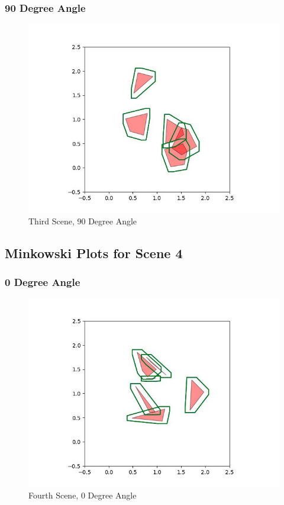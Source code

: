 \documentclass{article}
\begin{document}
\newpage
\subsubsection{90 Degree Angle}
\begin{figure}[h!]
	\includegraphics[width= 0.9 \linewidth]{Problem3_minkowski3_90.jpg}
	\centering
	\caption{Third Scene, 90 Degree Angle}
	\label{Problem3_minkowski3_90.jpg}
\end{figure}

\newpage
\subsection{Minkowski Plots for Scene 4}
\subsubsection{0 Degree Angle}
\begin{figure}[h!]
	\includegraphics[width= 0.9 \linewidth]{Problem3_minkowski4_0.jpg}
	\centering
	\caption{Fourth Scene, 0 Degree Angle}
	\label{Problem3_minkowski4_0.jpg}
\end{figure}
\end{document}

